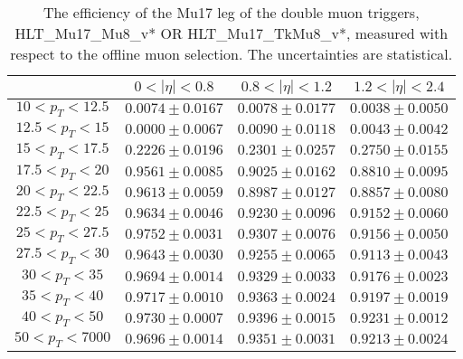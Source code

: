 \begin{table}[!ht]
\begin{center}
\begin{tabular}{c|c|c|c}
\hline & $0 < |\eta| < 0.8$ & $0.8 < |\eta| < 1.2$ & $1.2 < |\eta| < 2.4$  \\
\hline
$ 10 < p_T < 12.5$ & $0.0074 \pm 0.0167$ & $0.0078 \pm 0.0177$ & $0.0038 \pm 0.0050$  \\
$12.5 < p_T <  15$ & $0.0000 \pm 0.0067$ & $0.0090 \pm 0.0118$ & $0.0043 \pm 0.0042$  \\
$ 15 < p_T < 17.5$ & $0.2226 \pm 0.0196$ & $0.2301 \pm 0.0257$ & $0.2750 \pm 0.0155$  \\
$17.5 < p_T <  20$ & $0.9561 \pm 0.0085$ & $0.9025 \pm 0.0162$ & $0.8810 \pm 0.0095$  \\
$ 20 < p_T < 22.5$ & $0.9613 \pm 0.0059$ & $0.8987 \pm 0.0127$ & $0.8857 \pm 0.0080$  \\
$22.5 < p_T <  25$ & $0.9634 \pm 0.0046$ & $0.9230 \pm 0.0096$ & $0.9152 \pm 0.0060$  \\
$ 25 < p_T < 27.5$ & $0.9752 \pm 0.0031$ & $0.9307 \pm 0.0076$ & $0.9156 \pm 0.0050$  \\
$27.5 < p_T <  30$ & $0.9643 \pm 0.0030$ & $0.9255 \pm 0.0065$ & $0.9113 \pm 0.0043$  \\
$ 30 < p_T <  35$ & $0.9694 \pm 0.0014$ & $0.9329 \pm 0.0033$ & $0.9176 \pm 0.0023$  \\
$ 35 < p_T <  40$ & $0.9717 \pm 0.0010$ & $0.9363 \pm 0.0024$ & $0.9197 \pm 0.0019$  \\
$ 40 < p_T <  50$ & $0.9730 \pm 0.0007$ & $0.9396 \pm 0.0015$ & $0.9231 \pm 0.0012$  \\
$ 50 < p_T < 7000$ & $0.9696 \pm 0.0014$ & $0.9351 \pm 0.0031$ & $0.9213 \pm 0.0024$  \\
\hline
\hline
\end{tabular}
\caption{The efficiency of the Mu17 leg of the double muon triggers,
HLT\_Mu17\_Mu8\_v* OR HLT\_Mu17\_TkMu8\_v*,
measured with respect to the offline muon selection. 
The uncertainties are statistical.}
\label{tab:eff_muon_lead_dbl}
\end{center}
\end{table}


